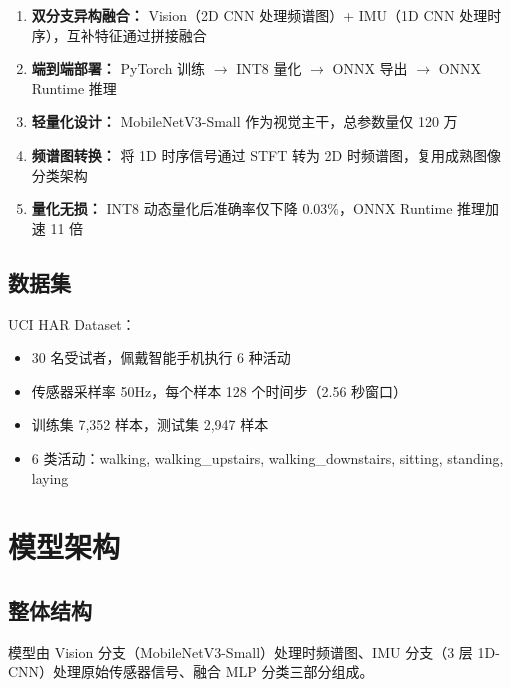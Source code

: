 \documentclass[12pt,a4paper]{ctexart}
\begin{document}
\begin{enumerate}[leftmargin=*]
    \item \textbf{双分支异构融合：} Vision（2D CNN 处理频谱图）+ IMU（1D CNN 处理时序），互补特征通过拼接融合
    \item \textbf{端到端部署：} PyTorch 训练 $\rightarrow$ INT8 量化 $\rightarrow$ ONNX 导出 $\rightarrow$ ONNX Runtime 推理
    \item \textbf{轻量化设计：} MobileNetV3-Small 作为视觉主干，总参数量仅 120 万
    \item \textbf{频谱图转换：} 将 1D 时序信号通过 STFT 转为 2D 时频谱图，复用成熟图像分类架构
    \item \textbf{量化无损：} INT8 动态量化后准确率仅下降 0.03\%，ONNX Runtime 推理加速 11 倍
\end{enumerate}

\subsection{数据集}

UCI HAR Dataset：
\begin{itemize}
    \item 30 名受试者，佩戴智能手机执行 6 种活动
    \item 传感器采样率 50Hz，每个样本 128 个时间步（2.56 秒窗口）
    \item 训练集 7,352 样本，测试集 2,947 样本
    \item 6 类活动：walking, walking\_upstairs, walking\_downstairs, sitting, standing, laying
\end{itemize}

\section{模型架构}

\subsection{整体结构}

模型由 Vision 分支（MobileNetV3-Small）处理时频谱图、IMU 分支（3 层 1D-CNN）处理原始传感器信号、融合 MLP 分类三部分组成。
\end{document}
